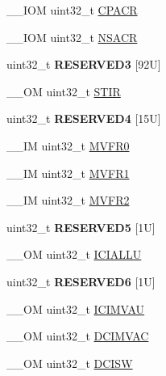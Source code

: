 \begin{DoxyCompactItemize}
\+\_\+\+\_\+\+I\+OM uint32\+\_\+t \hyperlink{struct_s_c_b___type_ac6a860c1b8d8154a1f00d99d23b67764}{C\+P\+A\+CR}
\item 
\+\_\+\+\_\+\+I\+OM uint32\+\_\+t \hyperlink{struct_s_c_b___type_a525790dfb9d9e3dd8eb126cdfebcd472}{N\+S\+A\+CR}
\item 
\mbox{\label{struct_s_c_b___type_aea707bb951ff0fade7716ae63d809c67}} 
uint32\+\_\+t {\bfseries R\+E\+S\+E\+R\+V\+E\+D3} \mbox{[}92\+U\mbox{]}
\item 
\+\_\+\+\_\+\+OM uint32\+\_\+t \hyperlink{struct_s_c_b___type_ad70825dd0869b7ccd07fb2b8680fcdb6}{S\+T\+IR}
\item 
\mbox{\label{struct_s_c_b___type_a1c0f2702e0987ca2370a9771b6df3475}} 
uint32\+\_\+t {\bfseries R\+E\+S\+E\+R\+V\+E\+D4} \mbox{[}15\+U\mbox{]}
\item 
\+\_\+\+\_\+\+IM uint32\+\_\+t \hyperlink{struct_s_c_b___type_a7a1ba0f875c0e97c1673882b1106e66b}{M\+V\+F\+R0}
\item 
\+\_\+\+\_\+\+IM uint32\+\_\+t \hyperlink{struct_s_c_b___type_a75d6299150fdcbbcb765e22ff27c432e}{M\+V\+F\+R1}
\item 
\+\_\+\+\_\+\+IM uint32\+\_\+t \hyperlink{struct_s_c_b___type_a280ef961518ecee3ed43a86404853c3d}{M\+V\+F\+R2}
\item 
\mbox{\label{struct_s_c_b___type_af3d8e275bd4c96416cf9cd7464bb7d7c}} 
uint32\+\_\+t {\bfseries R\+E\+S\+E\+R\+V\+E\+D5} \mbox{[}1\+U\mbox{]}
\item 
\+\_\+\+\_\+\+OM uint32\+\_\+t \hyperlink{struct_s_c_b___type_a573260e7836dbc43707df97dd475a0c8}{I\+C\+I\+A\+L\+LU}
\item 
\mbox{\label{struct_s_c_b___type_a1181e38c1923bf8f5d039f3441bbcaac}} 
uint32\+\_\+t {\bfseries R\+E\+S\+E\+R\+V\+E\+D6} \mbox{[}1\+U\mbox{]}
\item 
\+\_\+\+\_\+\+OM uint32\+\_\+t \hyperlink{struct_s_c_b___type_a5eca5a3e5aedd89a9655df8f5798e2b0}{I\+C\+I\+M\+V\+AU}
\item 
\+\_\+\+\_\+\+OM uint32\+\_\+t \hyperlink{struct_s_c_b___type_a4be79491ab1ed14f3b0237ba7e69063c}{D\+C\+I\+M\+V\+AC}
\item 
\+\_\+\+\_\+\+OM uint32\+\_\+t \hyperlink{struct_s_c_b___type_a22bcfd7e1bffebdbe98cdbc8d77a2f42}{D\+C\+I\+SW}
\item 

\end{DoxyCompactItemize}
